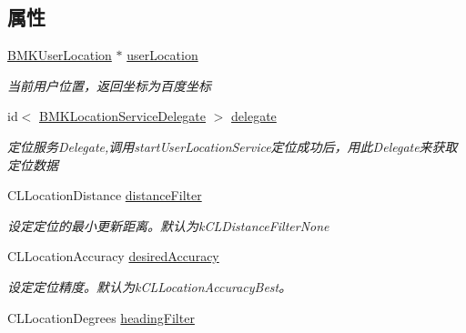 \subsection*{属性}
\begin{DoxyCompactItemize}
\item 
\hypertarget{interface_b_m_k_location_service_a19c6477dc79e94c8e20d7ddf1e52b0c2}{}\hyperlink{interface_b_m_k_user_location}{B\+M\+K\+User\+Location} $\ast$ \hyperlink{interface_b_m_k_location_service_a19c6477dc79e94c8e20d7ddf1e52b0c2}{user\+Location}\label{interface_b_m_k_location_service_a19c6477dc79e94c8e20d7ddf1e52b0c2}

\begin{DoxyCompactList}\small\item\em 当前用户位置，返回坐标为百度坐标 \end{DoxyCompactList}\item 
\hypertarget{interface_b_m_k_location_service_a6a3767cb278c4dba0a59950586b5e37d}{}id$<$ \hyperlink{protocol_b_m_k_location_service_delegate-p}{B\+M\+K\+Location\+Service\+Delegate} $>$ \hyperlink{interface_b_m_k_location_service_a6a3767cb278c4dba0a59950586b5e37d}{delegate}\label{interface_b_m_k_location_service_a6a3767cb278c4dba0a59950586b5e37d}

\begin{DoxyCompactList}\small\item\em 定位服务\+Delegate,调用start\+User\+Location\+Service定位成功后，用此\+Delegate来获取定位数据 \end{DoxyCompactList}\item 
\hypertarget{interface_b_m_k_location_service_acb15b8ebda25899c2859a3d403a3425d}{}C\+L\+Location\+Distance \hyperlink{interface_b_m_k_location_service_acb15b8ebda25899c2859a3d403a3425d}{distance\+Filter}\label{interface_b_m_k_location_service_acb15b8ebda25899c2859a3d403a3425d}

\begin{DoxyCompactList}\small\item\em 设定定位的最小更新距离。默认为k\+C\+L\+Distance\+Filter\+None \end{DoxyCompactList}\item 
\hypertarget{interface_b_m_k_location_service_a2af9a5961b0553dd49e40e1fcc6feb3d}{}C\+L\+Location\+Accuracy \hyperlink{interface_b_m_k_location_service_a2af9a5961b0553dd49e40e1fcc6feb3d}{desired\+Accuracy}\label{interface_b_m_k_location_service_a2af9a5961b0553dd49e40e1fcc6feb3d}

\begin{DoxyCompactList}\small\item\em 设定定位精度。默认为k\+C\+L\+Location\+Accuracy\+Best。 \end{DoxyCompactList}\item 
\hypertarget{interface_b_m_k_location_service_af9da37d0c21e23368b0cfb06ea0dddea}{}C\+L\+Location\+Degrees \hyperlink{interface_b_m_k_location_service_af9da37d0c21e23368b0cfb06ea0dddea}{heading\+Filter}\label{interface_b_m_k_location_service_af9da37d0c21e23368b0cfb06ea0dddea}


\end{DoxyCompactItemize}
